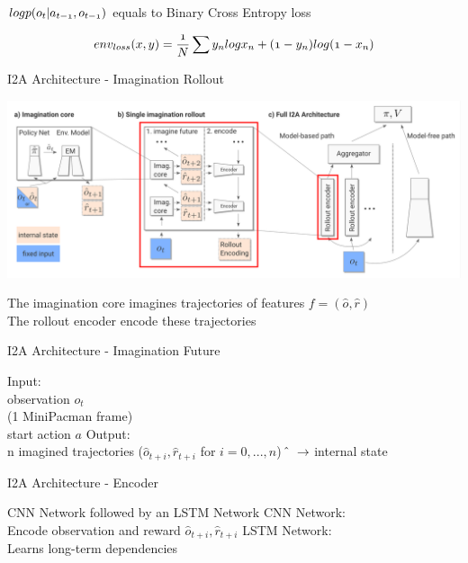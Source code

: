   $\mathnormal{log p(o_t | a_{t-1}, o_{t-1})}$ equals to Binary Cross Entropy loss 
   
\begin{equation} 
  \mathnormal{ 
  env_{loss}(x, y) = \frac{1}{N} \sum y_n log x_n + (1-y_n) log(1- x_n) 
  } 
  \end{equation} 
 
 
 
 
I2A Architecture - Imagination Rollout 
 
 
\includegraphics[width=\columnwidth]{./Images/i2a_all_imagination_rollout.png}%
 
The imagination core imagines trajectories of features $f = (\hat{o}, \hat{r})$\\ 
The rollout encoder encode these trajectories     
 
 
 
I2A Architecture - Imagination Future 
 
Input:\\ 
    observation $o_t$ \\ 
    (1 MiniPacman frame)\\ 
    start action $a$ 
Output:\\ 
    n imagined trajectories ($\hat{o}_{t+i}, \hat{r}_{t+i}$ for $i = 0, ..., n$) 
     $\hat{} \hspace{2mm} \rightarrow$ internal state 
   
 
I2A Architecture - Encoder 
 
     CNN Network followed by an LSTM Network 
    CNN Network:\\ 
    Encode observation and reward $\hat{o}_{t+i}, \hat{r}_{t+i}$ 
    LSTM Network:\\ 
    Learns long-term dependencies 
   
